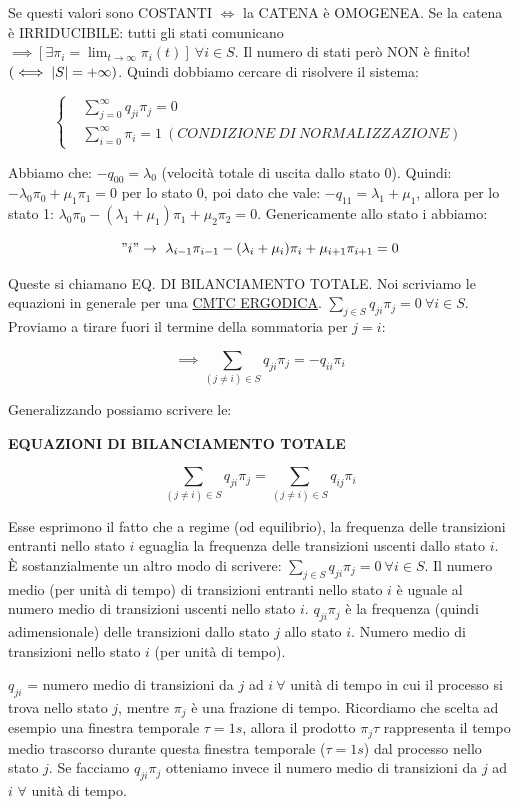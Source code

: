 Se questi valori sono COSTANTI $\iff$ la CATENA è OMOGENEA. Se la catena è IRRIDUCIBILE: tutti gli stati comunicano $\implies [\exists\pi_i = \lim_{t\to\infty}{\pi_i(t)}]\ \forall i\in S$. Il numero di stati però NON è finito! $(\iff \left\vert{S}\right\vert = +\infty)$. Quindi dobbiamo cercare di risolvere il sistema:

\[
	\left\{
	\begin{aligned}
	&\sum_{j=0}^\infty{q_{ji}\pi_j} = 0\\
	&\sum_{i=0}^\infty{\pi_i} = 1\ (CONDIZIONE\ DI\ NORMALIZZAZIONE)
	\end{aligned}
	\right.
\]

Abbiamo che: $-q_{00} = \lambda_0$ (velocità totale di uscita dallo stato 0). Quindi: $-\lambda_0\pi_0 + \mu_1\pi_1 = 0$ per lo stato 0, poi dato che vale: $-q_{11}=\lambda_1 + \mu_1$, allora per lo stato 1: $\lambda_0\pi_0 -( \lambda_1+\mu_1)\pi_1 + \mu_2\pi_2 = 0$. Genericamente allo stato i abbiamo:

\[
	"i" \rightarrow\ \lambda_{i-1}\pi_{i-1} - (\lambda_i +\mu_i)\pi_i + \mu_{i+1}\pi_{i+1} = 0
\]

Queste si chiamano EQ. DI BILANCIAMENTO TOTALE. Noi scriviamo le equazioni in generale per una \underline{CMTC ERGODICA}. $\sum_{j\in S}{q_{ji}\pi_j} = 0\ \forall i\in S$. Proviamo a tirare fuori il termine della sommatoria per $j=i$:

\[
	\implies \sum_{(j\neq i)\in S}{q_{ji}{\pi_j}} = -q_{ii}\pi_i
\]

Generalizzando possiamo scrivere le:


\begin{thrm}{\textbf{EQUAZIONI DI BILANCIAMENTO TOTALE}}

\[
	\sum_{(j\neq i)\in S}{q_{ji}\pi_j} = \sum_{(j\neq i)\in S}{q_{ij}\pi_i}
\]

\end{thrm}

Esse esprimono il fatto che a regime (od equilibrio), la frequenza delle transizioni entranti nello stato $i$ eguaglia la frequenza delle transizioni uscenti dallo stato $i$. \`E sostanzialmente un altro modo di scrivere: $\sum_{j\in S}{q_{ji}\pi_j} = 0\ \forall i\in S$. Il numero medio (per unità di tempo) di transizioni entranti nello stato $i$ è uguale al numero medio di transizioni uscenti nello stato $i$. $q_{ji}\pi_j$ è la frequenza (quindi adimensionale) delle transizioni dallo stato $j$ allo stato $i$. Numero medio di transizioni nello stato $i$ (per unità di tempo).

$q_{ji}$ = numero medio di transizioni da $j$ ad $i\ \forall$ unità di tempo in cui il processo si trova nello stato $j$, mentre $\pi_j$ è una frazione di tempo. Ricordiamo che scelta ad esempio una finestra temporale $\tau=1s$, allora il prodotto $\pi_j\tau$ rappresenta il tempo medio trascorso durante questa finestra temporale ($\tau=1s$) dal processo nello stato $j$. Se facciamo $q_{ji}\pi_j$ otteniamo invece il numero medio di transizioni da $j$ ad $i$ $\forall$ unità di tempo. 

